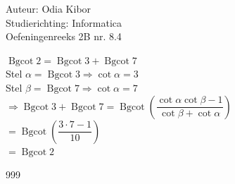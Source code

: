 \documentclass[a4paper]{article}
\begin{document}
  
\noindent \large Auteur: Odia Kibor \\
\noindent \large Studierichting: Informatica\\
\noindent \large Oefeningenreeks 2B nr. 8.4\\

\medskip

\normalsize


$\operatorname{Bgcot}2 = \operatorname{Bgcot}3 + \operatorname{Bgcot}7$  \\

Stel $\alpha = \operatorname{Bgcot} 3 \Rightarrow \cot \alpha = 3 $ \\

Stel $\beta = \operatorname{Bgcot}  7 \Rightarrow \cot \alpha = 7 $ \\

$\Rightarrow \operatorname{Bgcot}3 + \operatorname{Bgcot}7 = \operatorname{Bgcot} \left(\dfrac{\cot \alpha\cot \beta - 1}{\cot \beta + \cot \alpha}\right)$ \\

$= \operatorname{Bgcot} \left(\dfrac{3 \cdot 7 - 1}{10}\right)$ \\ 

$= \operatorname{Bgcot}2$ \\ 










\begin{thebibliography}{999}
\end{thebibliography}
\end{document}
